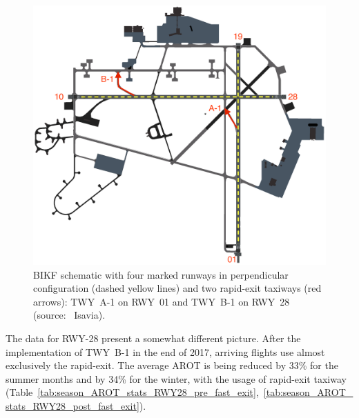\begin{figure}[h]
    \centering
    \includegraphics[width=1\textwidth]{graphics/BIKF_schematic.png}
    \caption[BIKF schematic]{BIKF schematic with four marked runways in perpendicular configuration (dashed yellow lines) and two rapid-exit taxiways (red arrows): TWY~A-1 on RWY~01 and TWY~B-1 on RWY~28 (source:~ Isavia).}
    \label{fig:BIKF_schematic}
\end{figure}

The data for RWY-28 present a somewhat different picture. After the implementation of TWY~B-1 in the end of 2017, arriving flights use almost exclusively the rapid-exit. The average AROT is being reduced by 33\% for the summer months and by 34\% for the winter, with the usage of rapid-exit taxiway (Table~\ref{tab:season_AROT_stats_RWY28_pre_fast_exit},~\ref{tab:season_AROT_stats_RWY28_post_fast_exit}). 

